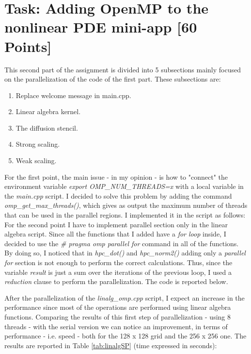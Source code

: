\documentclass[unicode,11pt,a4paper,oneside,numbers=endperiod,openany]{scrartcl}
\begin{document}
 

\section{Task:  Adding OpenMP to the nonlinear PDE mini-app [60 Points]}
This second part of the assignment is divided into 5 subsections mainly focused on the parallelization of the code of the first part. These subsections are:
\begin{enumerate}
	\item Replace welcome message in main.cpp.
	\item Linear algebra kernel.
	\item The diffusion stencil.
	\item Strong scaling.
	\item Weak scaling.
\end{enumerate}

For the first point, the main issue - in my opinion - is how to "connect" the environment variable \textit{export OMP\_NUM\_THREADS=x} with a local variable in the \textit{main.cpp} script. I decided to solve this problem by adding the command \textit{omp\_get\_max\_threads()}, which gives as output the maximum number of threads that can be used in the parallel regions. I implemented it in the script as follows:\\


For the second point I have to implement parallel section only in the linear algebra script. Since all the functions that I added have a \textit{for loop} inside, I decided to use the \textit{\# pragma omp parallel for} command in all of the functions. By doing so, I noticed that in \textit{hpc\_dot()} and \textit{hpc\_norm2()} adding only a \textit{parallel for} section is not enough to perform the correct calculations. Thus, since the variable \textit{result} is just a sum over the iterations of the previous loop, I used a \textit{reduction} clause to perform the parallelization. The code is reported below.
 

After the parallelization of the \textit{linalg\_omp.cpp} script, I expect an increase in the performance since most of the operations are performed using linear algebra functions.
Comparing the results of this first step of parallelization - using 8 threads - with the serial version we can notice an improvement, in terms of performance - i.e. speed - both for the 128 x 128 grid and the 256 x 256 one. The results are reported in Table \ref{tab:linalgSP} (time expressed in seconds):
\end{document}
